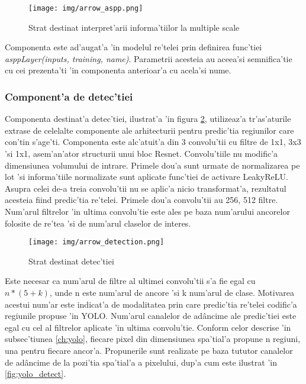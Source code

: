 \documentclass[12pt,a4paper,twoside]{report}
\begin{document}
\begin{figure}[H]
  \texttt{[image: img/arrow\_aspp.png]}
  \centering
  \caption{Strat destinat interpret'arii informa'tiilor la multiple scale \protect \footnotemark}
  \label{fig:arrow_aspp}
\end{figure}

Componenta este ad'augat'a 'in modelul re'telei prin definirea func'tiei \textit{asppLayer(inputs, training, name)}. Parametrii acesteia au aceea'si semnifica'tie cu cei prezenta'ti 'in componenta anterioar'a cu acela'si nume.

\subsubsection{Component'a de detec'tiei}
Componenta destinat'a detec'tiei, ilustrat'a 'in figura \ref{fig:arrow_detection}, utilizeaz'a tr'as'aturile extrase de celelalte componente ale arhitecturii pentru predic'tia regiunilor care con'tin s'age'ti. Componenta este alc'atuit'a din 3 convolu'tii cu filtre de 1x1, 3x3 'si 1x1, asem'an'ator structurii unui bloc Resnet. Convolu'tiile nu modific'a dimensiunea volumului de intrare. Primele dou'a sunt urmate de normalizarea pe lot 'si informa'tiile normalizate sunt aplicate func'tiei de activare LeakyReLU.  Asupra celei de-a treia convolu'tii nu se aplic'a nicio transformat'a, rezultatul acesteia fiind predic'tia re'telei. Primele dou'a convolu'tii au 256, 512 filtre. Num'arul filtrelor 'in ultima convolu'tie este ales pe baza num'arului ancorelor folosite de re'tea 'si de num'arul claselor de interes.

\begin{figure}[H]
  \centering
  \texttt{[image: img/arrow\_detection.png]}
  \centering
  \caption{Strat destinat detec'tiei}
  \label{fig:arrow_detection}
\end{figure}

Este necesar ca num'arul de filtre al ultimei convolu'tii s'a fie egal cu $n * (5 + k)$, unde n este num'arul de ancore 'si k num'arul de clase. Motivarea acestui num'ar este indicat'a de modalitatea prin care predic'tia re'telei codific'a regiunile propuse 'in YOLO. Num'arul canalelor de ad\^ancime ale predic'tiei este egal cu cel al filtrelor aplicate 'in ultima convolu'tie. Conform celor descrise 'in subsec'tiunea \ref{ch:yolo}, fiecare pixel din dimensiunea spa'tial'a propune n regiuni, una pentru fiecare ancor'a. Propunerile sunt realizate pe baza tututor canalelor de ad\^ancime de la pozi'tia spa'tial'a a pixelului, dup'a cum este ilustrat 'in \ref{fig:yolo_detect}.
\end{document}

